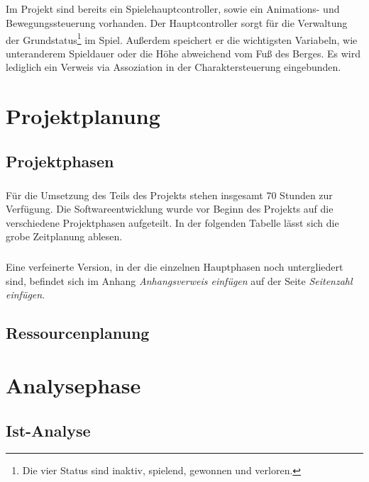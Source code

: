 \paragraph{}
Im Projekt sind bereits ein Spielehauptcontroller, sowie ein Animations- und Bewegungssteuerung vorhanden.
Der Hauptcontroller sorgt für die Verwaltung der Grundstatus\footnote{Die vier Status sind inaktiv, spielend, gewonnen und verloren.} im Spiel. Außerdem speichert er die wichtigsten Variabeln, wie unteranderem Spieldauer oder die Höhe abweichend vom Fuß des Berges. Es wird lediglich ein Verweis via Assoziation in der Charaktersteuerung eingebunden.

\chapter{Projektplanung}
\section{Projektphasen}
\paragraph{}
Für die Umsetzung des Teils des Projekts stehen insgesamt 70 Stunden zur Verfügung. Die Softwareentwicklung wurde vor Beginn des Projekts auf die verschiedene Projektphasen aufgeteilt. In der folgenden Tabelle  lässt sich die grobe Zeitplanung ablesen.\\

\paragraph{}
Eine verfeinerte Version, in der die einzelnen Hauptphasen noch untergliedert sind, befindet sich im Anhang \textit{Anhangsverweis einfügen} auf der Seite \textit{Seitenzahl einfügen}.

\section{Ressourcenplanung}

\chapter{Analysephase}
\section{Ist-Analyse}
